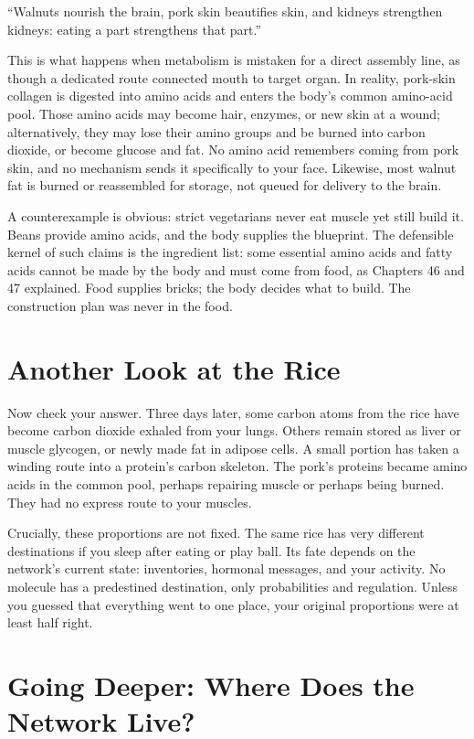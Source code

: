 \begin{wuqu}
``Walnuts nourish the brain, pork skin beautifies skin, and kidneys strengthen kidneys: eating a part strengthens that part.''

This is what happens when metabolism is mistaken for a direct assembly line, as though a dedicated route connected mouth to target organ. In reality, pork-skin collagen is digested into amino acids and enters the body's common amino-acid pool. Those amino acids may become hair, enzymes, or new skin at a wound; alternatively, they may lose their amino groups and be burned into carbon dioxide, or become glucose and fat. No amino acid remembers coming from pork skin, and no mechanism sends it specifically to your face. Likewise, most walnut fat is burned or reassembled for storage, not queued for delivery to the brain.

A counterexample is obvious: strict vegetarians never eat muscle yet still build it. Beans provide amino acids, and the body supplies the blueprint. The defensible kernel of such claims is the ingredient list: some essential amino acids and fatty acids cannot be made by the body and must come from food, as Chapters 46 and 47 explained. Food supplies bricks; the body decides what to build. The construction plan was never in the food.
\end{wuqu}

\section{Another Look at the Rice}

Now check your answer. Three days later, some carbon atoms from the rice have become carbon dioxide exhaled from your lungs. Others remain stored as liver or muscle glycogen, or newly made fat in adipose cells. A small portion has taken a winding route into a protein's carbon skeleton. The pork's proteins became amino acids in the common pool, perhaps repairing muscle or perhaps being burned. They had no express route to your muscles.

Crucially, these proportions are not fixed. The same rice has very different destinations if you sleep after eating or play ball. Its fate depends on the network's current state: inventories, hormonal messages, and your activity. No molecule has a predestined destination, only probabilities and regulation. Unless you guessed that everything went to one place, your original proportions were at least half right.

\section{Going Deeper: Where Does the Network Live?}


